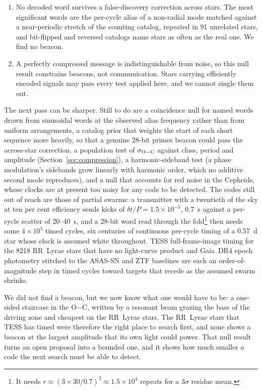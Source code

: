 \documentclass[final,5p]{elsarticle}
\newcommand{\oc}{O$-$C}
\newcommand{\dtp}{\ensuremath{\delta t/P}}
\begin{document}
\begin{enumerate}
\item No decoded word survives a false-discovery correction across stars. The most significant words are the per-cycle alias of a non-radial mode matched against a near-periodic stretch of the counting catalog, repeated in 91 unrelated stars, and bit-flipped and reversed catalogs name stars as often as the real one. We find no beacon.
\item A perfectly compressed message is indistinguishable from noise, so this null result constrains beacons, not communication. Stars carrying efficiently encoded signals may pass every test applied here, and we cannot single them out.
\end{enumerate}

The next pass can be sharper. Still to do are a coincidence null for named words drawn from sinusoidal words at the observed alias frequency rather than from uniform arrangements, a catalog prior that weights the start of each short sequence more heavily, so that a genuine 28-bit primes beacon could pass the across-star correction, a population test of $\sigma_{\rm O-C}$ against class, period and amplitude (Section~\ref{sec:compression}), a harmonic-sideband test (a phase modulation's sidebands grow linearly with harmonic order, which no additive second mode reproduces), and a null that accounts for red noise in the Cepheids, whose clocks are at present too noisy for any code to be detected. The codes still out of reach are those of partial swarms: a transmitter with a twentieth of the sky at ten per cent efficiency sends kicks of $\dtp=1.5\times10^{-5}$, 0.7~s against a per-cycle scatter of 20--40~s, and a 28-bit word read through the fold\footnote{It needs $r\approx(3\times30/0.7)^2\approx1.5\times10^{4}$ repeats for a $3\sigma$ residue mean.} then needs some $4\times10^{5}$ timed cycles, six centuries of continuous per-cycle timing of a 0.57~d star whose clock is assumed white throughout. TESS full-frame-image timing for the 8218 RR~Lyrae stars that have no light-curve product and Gaia~DR4 epoch photometry stitched to the ASAS-SN and ZTF baselines are each an order-of-magnitude step in timed cycles toward targets that recede as the assumed swarm shrinks.

We did not find a beacon, but we now know what one would have to be: a one-sided staircase in the \oc{}, written by a resonant beam grazing the base of the driving zone and cheapest on the RR~Lyrae stars. The RR~Lyrae stars that TESS has timed were therefore the right place to search first, and none shows a beacon at the largest amplitude that its own light could power. That null result turns an open proposal into a bounded one, and it shows how much smaller a code the next search must be able to detect.
\end{document}
